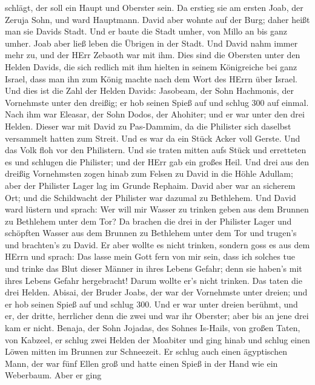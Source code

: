 schlägt, der soll ein Haupt und Oberster sein. Da erstieg sie am ersten
Joab, der Zeruja Sohn, und ward Hauptmann.  David aber
wohnte auf der Burg; daher heißt man sie Davids Stadt.  Und
er baute die Stadt umher, von Millo an bis ganz umher. Joab aber ließ
leben die Übrigen in der Stadt.  Und David nahm immer mehr
zu, und der HErr Zebaoth war mit ihm.  Dies sind die
Obersten unter den Helden Davids, die sich redlich mit ihm hielten in
seinem Königreiche bei ganz Israel, dass man ihn zum König machte nach
dem Wort des HErrn über Israel.  Und dies ist die Zahl der
Helden Davids: Jasobeam, der Sohn Hachmonis, der Vornehmste unter den
dreißig; er hob seinen Spieß auf und schlug 300 auf einmal.
 Nach ihm war Eleasar, der Sohn Dodos, der Ahohiter; und er
war unter den drei Helden.  Dieser war mit David zu
Pas-Dammim, da die Philister sich daselbst versammelt hatten zum Streit.
Und es war da ein Stück Acker voll Gerste. Und das Volk floh vor den
Philistern.  Und sie traten mitten aufs Stück und
erretteten es und schlugen die Philister; und der HErr gab ein großes
Heil.  Und drei aus den dreißig Vornehmsten zogen hinab zum
Felsen zu David in die Höhle Adullam; aber der Philister Lager lag im
Grunde Rephaim.  David aber war an sicherem Ort; und die
Schildwacht der Philister war dazumal zu Bethlehem.  Und
David ward lüstern und sprach: Wer will mir Wasser zu trinken geben aus
dem Brunnen zu Bethlehem unter dem Tor?  Da brachen die
drei in der Philister Lager und schöpften Wasser aus dem Brunnen zu
Bethlehem unter dem Tor und trugen's und brachten's zu David. Er aber
wollte es nicht trinken, sondern goss es aus dem HErrn  und
sprach: Das lasse mein Gott fern von mir sein, dass ich solches tue und
trinke das Blut dieser Männer in ihres Lebens Gefahr; denn sie haben's
mit ihres Lebens Gefahr hergebracht! Darum wollte er's nicht trinken.
Das taten die drei Helden.  Abisai, der Bruder Joabs, der
war der Vornehmste unter dreien; und er hob seinen Spieß auf und schlug
300. Und er war unter dreien berühmt,  und er, der dritte,
herrlicher denn die zwei und war ihr Oberster; aber bis an jene drei kam
er nicht.  Benaja, der Sohn Jojadas, des Sohnes Is-Hails,
von großen Taten, von Kabzeel, er schlug zwei Helden der Moabiter und
ging hinab und schlug einen Löwen mitten im Brunnen zur Schneezeit.
 Er schlug auch einen ägyptischen Mann, der war fünf Ellen
groß und hatte einen Spieß in der Hand wie ein Weberbaum. Aber er ging
